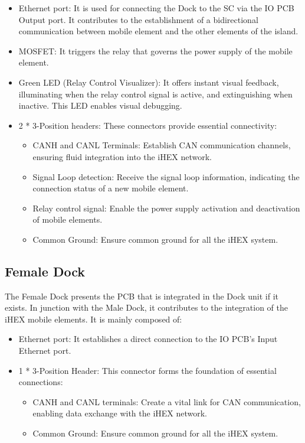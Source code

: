 \begin{itemize}
    \item Ethernet port: It is used for connecting the Dock to the SC via the IO PCB Output port. It contributes to the establishment of a bidirectional communication between mobile element and the other elements of the island.
    \item MOSFET: It triggers the relay that governs the power supply of the mobile element.
    \item Green LED (Relay Control Visualizer): It offers instant visual feedback, illuminating when the relay control signal is active, and extinguishing when inactive. This LED enables visual debugging.
    \item 2 * 3-Position headers: These connectors provide essential connectivity:
    \begin{itemize}
        \item CANH and CANL Terminals: Establish CAN communication channels, ensuring fluid integration into the iHEX network.
        \item Signal Loop detection: Receive the signal loop information, indicating the connection status of a new mobile element.
        \item Relay control signal: Enable the power supply activation and deactivation of mobile elements.
        \item Common Ground: Ensure common ground for all the iHEX system.
    \end{itemize}   
\end{itemize}

\subsection{Female Dock}
The Female Dock presents the PCB that is integrated in the Dock unit if it exists. In junction with the Male Dock, it contributes to the integration of the iHEX mobile elements. It is mainly composed of:

\begin{itemize}
    \item Ethernet port: It establishes a direct connection to the IO PCB's Input Ethernet port.
    \item 1 * 3-Position Header: This connector forms the foundation of essential connections:
    \begin{itemize}
        \item CANH and CANL terminals: Create a vital link for CAN communication, enabling data exchange with the iHEX network.
        \item Common Ground: Ensure common ground for all the iHEX system.
    \end{itemize}    
\end{itemize}

